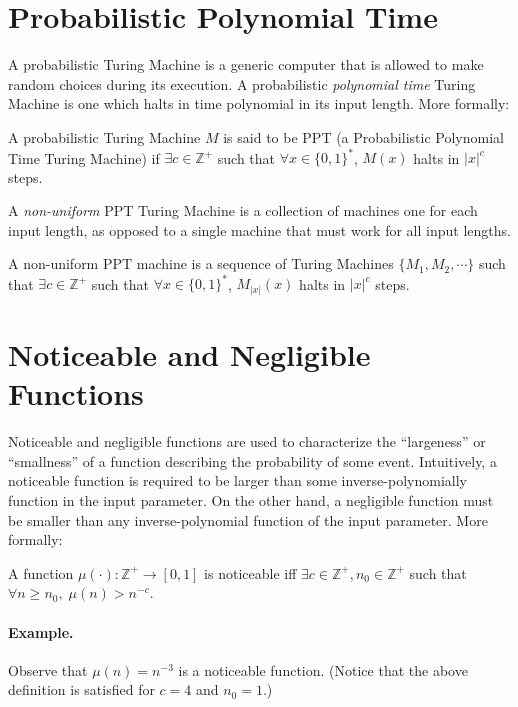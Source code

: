 \documentclass[12pt]{tufte-book}
\begin{document}
\section{Probabilistic Polynomial Time}
\label{ssec:ppt}
A probabilistic Turing Machine is a generic computer that is allowed to make random choices during its execution. A probabilistic \textit{polynomial time} Turing Machine is one which halts in time polynomial in its input length. More formally:

\begin{definition}
A probabilistic Turing Machine $M$ is said to be PPT (a Probabilistic Polynomial Time Turing Machine) if $\exists c \in \mathbb{Z}^+$ such that $\forall x \in\{0,1\}^*$, $M(x)$ halts in $|x|^c$ steps.
\end{definition}

A {\em non-uniform} PPT Turing Machine is a collection of machines one for each input length, as opposed to a single machine that must work for all input lengths.

\begin{definition}
A non-uniform PPT machine is a sequence of Turing Machines $\{ M_1, M_2, \cdots \}$ such that $\exists c \in \mathbb{Z}^+$ such that $\forall x \in\{0,1\}^*$, $M_{|x|}(x)$ halts in $|x|^c$ steps.
\end{definition}



\section{Noticeable and Negligible Functions}
\label{ssec:nnf}
Noticeable and negligible functions are used to characterize the ``largeness'' or ``smallness'' of a function describing the probability of some event.  Intuitively, a noticeable function is required to be larger than some inverse-polynomially function in the input parameter. On the other hand, a negligible function must be smaller than any inverse-polynomial function of the input parameter. More formally:


\begin{definition}
A function $\mu(\cdot): \mathbb{Z}^+ \rightarrow [0,1]$ is noticeable iff $\exists c \in \mathbb{Z}^+, n_0 \in \mathbb{Z}^+$ such that $\forall n \geq n_0 , \; \mu(n) > n^{-c}$.
\end{definition}

\paragraph{Example.} Observe that $\mu(n) = n^{-3}$ is a noticeable function.  (Notice that the above definition is satisfied for $c = 4$ and $n_0 = 1$.)
\end{document}
